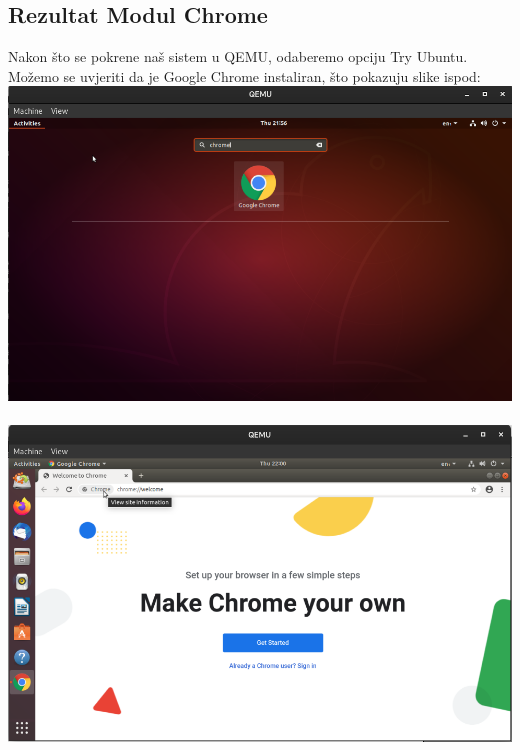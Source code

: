\documentclass[12pt,vi]{mitthesis}
\begin{document}
\subsection*{Rezultat Modul Chrome}
\indent
Nakon što se pokrene naš sistem u QEMU, odaberemo opciju Try Ubuntu. Možemo se uvjeriti da je Google Chrome instaliran, što pokazuju slike ispod:\\
\includegraphics[width=\linewidth]{images/chromeLive.png}\\\\
\includegraphics[width=\linewidth]{images/chromeLive2.png}\\
\end{document}
